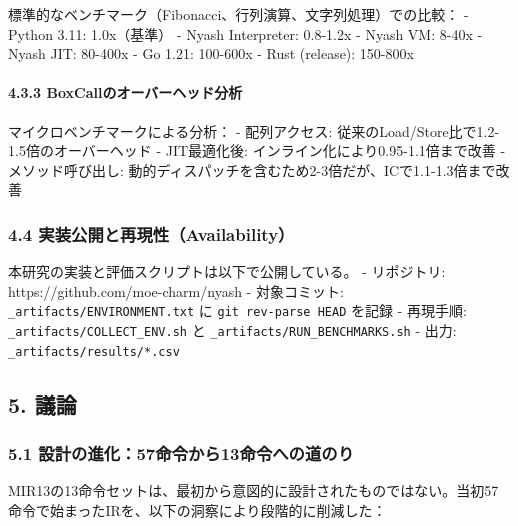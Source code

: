 \documentclass[
]{article}
\begin{document}
標準的なベンチマーク（Fibonacci、行列演算、文字列処理）での比較： -
Python 3.11: 1.0x（基準） - Nyash Interpreter: 0.8-1.2x - Nyash VM:
8-40x - Nyash JIT: 80-400x - Go 1.21: 100-600x - Rust (release):
150-800x

\hypertarget{boxcallux306eux30aaux30fcux30d0ux30fcux30d8ux30c3ux30c9ux5206ux6790}{%
\paragraph{4.3.3
BoxCallのオーバーヘッド分析}\label{boxcallux306eux30aaux30fcux30d0ux30fcux30d8ux30c3ux30c9ux5206ux6790}}

マイクロベンチマークによる分析： - 配列アクセス:
従来のLoad/Store比で1.2-1.5倍のオーバーヘッド - JIT最適化後:
インライン化により0.95-1.1倍まで改善 - メソッド呼び出し:
動的ディスパッチを含むため2-3倍だが、ICで1.1-1.3倍まで改善

\hypertarget{ux5b9fux88c5ux516cux958bux3068ux518dux73feux6027availability}{%
\subsubsection{4.4
実装公開と再現性（Availability）}\label{ux5b9fux88c5ux516cux958bux3068ux518dux73feux6027availability}}

本研究の実装と評価スクリプトは以下で公開している。 - リポジトリ:
https://github.com/moe-charm/nyash - 対象コミット:
\texttt{\_artifacts/ENVIRONMENT.txt} に \texttt{git\ rev-parse\ HEAD}
を記録 - 再現手順: \texttt{\_artifacts/COLLECT\_ENV.sh} と
\texttt{\_artifacts/RUN\_BENCHMARKS.sh} - 出力:
\texttt{\_artifacts/results/*.csv}

\hypertarget{ux8b70ux8ad6}{%
\subsection{5. 議論}\label{ux8b70ux8ad6}}

\hypertarget{ux8a2dux8a08ux306eux9032ux531657ux547dux4ee4ux304bux308913ux547dux4ee4ux3078ux306eux9053ux306eux308a}{%
\subsubsection{5.1
設計の進化：57命令から13命令への道のり}\label{ux8a2dux8a08ux306eux9032ux531657ux547dux4ee4ux304bux308913ux547dux4ee4ux3078ux306eux9053ux306eux308a}}

MIR13の13命令セットは、最初から意図的に設計されたものではない。当初57命令で始まったIRを、以下の洞察により段階的に削減した：
\end{document}
